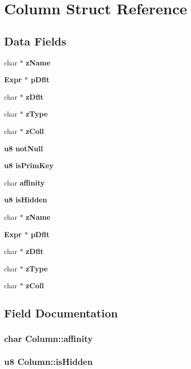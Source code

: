 \section{Column Struct Reference}
\label{structColumn}
\subsection*{Data Fields}
\begin{CompactItemize}
\item 
char $\ast$ \bf{z\-Name}
\item 
\bf{Expr} $\ast$ \bf{p\-Dflt}
\item 
char $\ast$ \bf{z\-Dflt}
\item 
char $\ast$ \bf{z\-Type}
\item 
char $\ast$ \bf{z\-Coll}
\item 
\bf{u8} \bf{not\-Null}
\item 
\bf{u8} \bf{is\-Prim\-Key}
\item 
char \bf{affinity}
\item 
\bf{u8} \bf{is\-Hidden}
\item 
char $\ast$ \bf{z\-Name}
\item 
\bf{Expr} $\ast$ \bf{p\-Dflt}
\item 
char $\ast$ \bf{z\-Dflt}
\item 
char $\ast$ \bf{z\-Type}
\item 
char $\ast$ \bf{z\-Coll}
\end{CompactItemize}


\subsection{Field Documentation}
\subsubsection{\setlength{\rightskip}{0pt plus 5cm}char \bf{Column::affinity}}\label{structColumn_2e53be9ddcf5ad7d5e759b46daf99ac6}


\subsubsection{\setlength{\rightskip}{0pt plus 5cm}\bf{u8} \bf{Column::is\-Hidden}}\label{structColumn_b1ab9595a0d9c7fc01be4226e1dcffbd}


